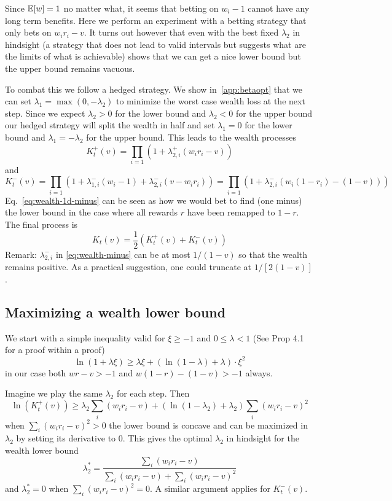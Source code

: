 Since $\mathbb{E}[w]=1$ no matter what, it seems that betting  on $w_i-1$ 
cannot have any long term benefits. Here we perform an experiment with a 
betting strategy that only bets on $w_i r_i -v$. It turns out however that
even with the best fixed $\lambda_2$ in hindsight (a strategy that does not lead 
to valid intervals but suggests what are the limits of what is achievable) 
shows that we can get a nice lower bound but the upper bound remains vacuous. 

To combat this we follow a hedged strategy. 
We show 
in~\ref{app:betaopt} that we can set $\lambda_1=\max(0,-\lambda_2)$ to minimize the worst case wealth loss at the next step.
Since we expect $\lambda_2>0$ for the lower bound and $\lambda_2<0$ 
for the upper bound our hedged strategy will 
split the wealth in 
half and set $\lambda_1=0$ for the lower bound and $\lambda_1=-\lambda_2$ 
for the upper bound. This leads to the wealth processes
\[
K_t^{+}(v)=\prod_{i=1} (1+\lambda_{2,i}^{+} (w_i r_i -v))
\]
and
\begin{equation}\label{eq:wealth-1d-minus}
K_t^{-}(v)=\prod_{i=1} (1+\lambda_{1,i}^{-}(w_i-1)+\lambda_{2,i}^{-} (v-w_i r_i))
=\prod_{i=1} (1+\lambda_{2,i}^{-} (w_i (1-r_i)-(1-v)))
\end{equation}
Eq.~\eqref{eq:wealth-1d-minus} 
can be seen as how we would bet to find (one minus) the 
lower bound in the case where all rewards $r$ have been remapped 
to $1-r$. The final process is 
\[
K_t(v)=\frac{1}{2}(K_t^{+}(v)+K_t^{-}(v))
\]
Remark: $\lambda_{2,i}^{-}$ in \eqref{eq:wealth-minus} can be at most $1/(1-v)$ so that the wealth remains positive. As a practical suggestion, one could truncate at $1/[2(1-v)]$.

\subsection{Maximizing a wealth lower bound}

We start with a simple inequality valid for $\xi\geq-1$ and 
$0\leq \lambda < 1$ (See \cite{fan2015exponential} Prop 4.1 for a proof within a proof)
\begin{equation}
\ln(1+\lambda \xi) \geq \lambda \xi+\left(\ln\left(1-\lambda\right)+\lambda\right)\cdot \xi^{2}
\label{eq:fanbound}
\end{equation}
in our case both $wr-v>-1$ and $w(1-r)-(1-v)>-1$ always.

Imagine we play the same $\lambda_2$ for each step. Then
\[
\ln(K_t^{+}(v)) \geq \lambda_2 \sum_i (w_i r_i -v) + \left(\ln\left(1-\lambda_2\right)+\lambda_2\right) \sum_i (w_i r_i -v)^2
\]
when $\sum_i (w_i r_i -v)^2>0$ the lower bound is concave and can 
be maximized in $\lambda_2$ by setting its derivative to 0. This gives
the optimal $\lambda_2$ in hindsight for the wealth lower bound 
\[
\lambda_2^* = \frac{\sum_i (w_i r_i -v)}{\sum_i (w_i r_i -v)+\sum_i (w_i r_i -v)^2}
\]
and $\lambda_2^*=0$ when $\sum_i (w_i r_i -v)^2=0$. A similar argument 
applies for $K_t^{-}(v)$.

